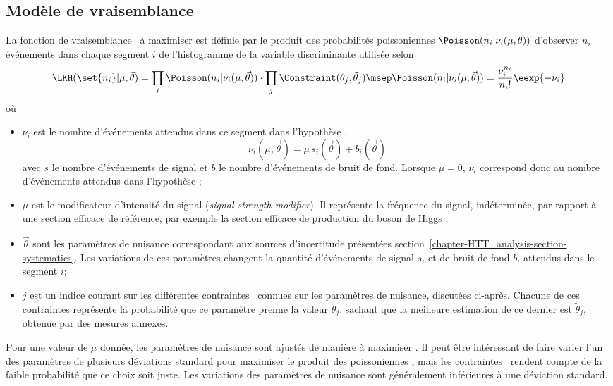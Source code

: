 \subsection{Modèle de vraisemblance}\label{chapter-HTT_analysis-section-signal_extraction-likelihood}
La fonction de vraisemblance \LKH\ à maximiser est définie par
le produit des probabilités poissoniennes $\Poisson (n_i | \nu_i(\mu,\vec{\theta}))$ d'observer $n_i$ événements dans chaque segment $i$ de l'histogramme de la variable discriminante utilisée
selon
\begin{equation}
\LKH(\set{n_i} | \mu,\vec{\theta})
=
\prod_i \Poisson(n_i | \nu_i(\mu,\vec{\theta}))
\cdot
\prod_j \Constraint(\theta_j, \tilde{\theta}_j)
\msep
\Poisson(n_i | \nu_i(\mu,\vec{\theta}))
=
\frac{\nu_i^{n_i}}{{n_i}!}\eexp{-\nu_i}
\end{equation}
où
\begin{itemize}
\item $\nu_i$ est le nombre d'événements attendus dans ce segment dans l'hypothèse \hypSB, \ie
\begin{equation}
\nu_i(\mu,\vec{\theta}) = \mu \, s_i(\vec{\theta}) + b_i(\vec{\theta})
\end{equation}
avec
$s$ le nombre d'événements de signal
et
$b$ le nombre d'événements de bruit de fond.
Lorsque $\mu=0$, $\nu_i$ correspond donc au nombre d'événements attendus dans l'hypothèse \hypB;
\item $\mu$ est le modificateur d'intensité du signal (\emph{signal strength modifier}).
Il représente la fréquence du signal, indéterminée, par rapport à une section efficace de référence, par exemple la section efficace de production du boson de Higgs \higgs;
\item $\vec{\theta}$ sont les paramètres de nuisance correspondant aux sources d'incertitude présentées section~\ref{chapter-HTT_analysis-section-systematics}.
Les variations de ces paramètres changent la quantité d'événements de signal $s_i$ et de bruit de fond $b_i$ attendus dans le segment $i$;
\item $j$ est un indice courant sur les différentes contraintes \Constraint\ connues sur les paramètres de nuisance, discutées ci-après.
Chacune de ces contraintes représente la probabilité que ce paramètre prenne la valeur $\theta_j$, sachant que la meilleure estimation de ce dernier est $\tilde{\theta}_j$, obtenue par des mesures annexes.
\end{itemize}
Pour une valeur de $\mu$ donnée,
les paramètres de nuisance sont ajustés de manière à maximiser \LKH.
Il peut être intéressant de faire varier l'un des paramètres de plusieurs déviations standard pour maximiser le produit des poissoniennes \Poisson,
mais les contraintes \Constraint\ rendent compte de la faible probabilité que ce choix soit juste.
Les variations des paramètres de nuisance sont généralement inférieures à une déviation standard.
